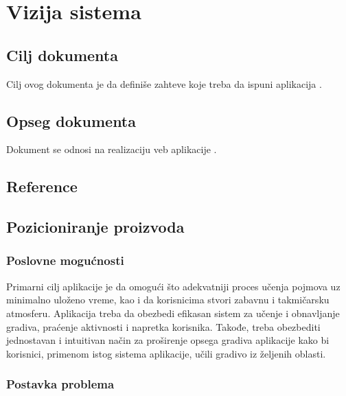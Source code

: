 \part{Vizija sistema}

\chapter{Cilj dokumenta}
Cilj ovog dokumenta je da definiše zahteve koje treba da ispuni aplikacija \UpamtiOnline{}.



\chapter{Opseg dokumenta}
Dokument se odnosi na realizaciju veb aplikacije \UpamtiOnline{}.




\chapter{Reference}




\chapter{Pozicioniranje proizvoda}

\section{Poslovne mogućnosti}
Primarni cilj aplikacije \UpamtiOnline{} je da omogući što adekvatniji proces učenja pojmova uz minimalno uloženo vreme, kao i da korisnicima stvori zabavnu i takmičarsku atmosferu.
Aplikacija treba da obezbedi efikasan sistem za učenje i obnavljanje gradiva, praćenje aktivnosti i napretka korisnika.
Takođe, treba obezbediti jednostavan i intuitivan način za proširenje opsega gradiva aplikacije kako bi korisnici, primenom istog sistema aplikacije, učili gradivo iz željenih oblasti.

\section{Postavka problema}

